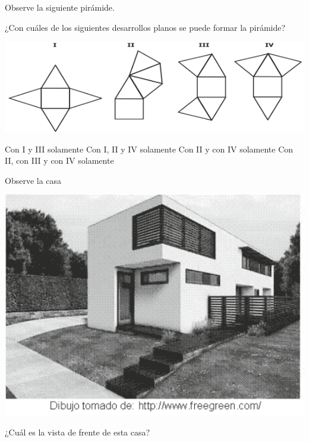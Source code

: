 \documentclass[10pt,letterpaper,addpoints]{exam}
\begin{document}
\begin{multicols}{2}
 \begin{questions}
 \question Observe la siguiente pirámide.
 \begin{center}
 \end{center}
 ¿Con cuáles de los siguientes desarrollos planos se puede formar la pirámide?
 \begin{center}
 \includegraphics[scale=.45]{Images/Pantallazo.png} 
 \end{center}
 \begin{choices}
 \choice Con I y III solamente
 \CorrectChoice Con I, II y IV solamente
 \choice Con II y con IV solamente
 \choice Con II, con III y con IV solamente
 \end{choices}
 \question Observe la casa 
 \begin{center}
 \includegraphics[scale=.15]{Images/frente-casa.png} 
 \end{center}
 ¿Cuál es la vista de frente de esta casa?

\end{questions}
\end{multicols}
\end{document}
